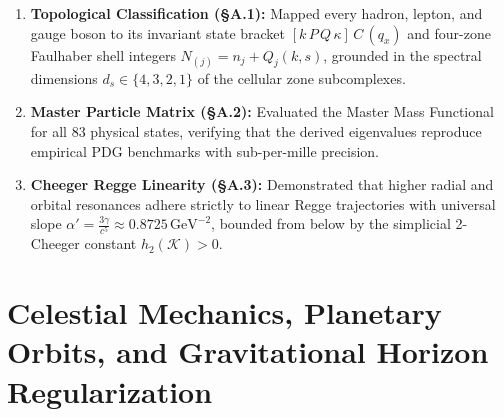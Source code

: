 \documentclass[
    12pt,
    a4paper,
    headings=normal,
    twoside=false,
    open=any,
    parskip=half
]{scrbook}
\begin{document}
\begin{tcolorbox}[colback=maincolor!3!white, colframe=maincolor!80!black, title={\textbf{Grand Synthesis of Appendix A}}]
\begin{enumerate}[leftmargin=1.5em, itemsep=5pt]
    \item \textbf{Topological Classification (§A.1):} Mapped every hadron, lepton, and gauge boson to its invariant state bracket $[k \, P \, Q \, \kappa] \, C \, (q_x)$ and four-zone Faulhaber shell integers $N_{(j)} = n_j + Q_j(k, s)$, grounded in the spectral dimensions $d_s \in \{4, 3, 2, 1\}$ of the cellular zone subcomplexes.
    \item \textbf{Master Particle Matrix (§A.2):} Evaluated the Master Mass Functional for all 83 physical states, verifying that the derived eigenvalues reproduce empirical PDG benchmarks with sub-per-mille precision.
    \item \textbf{Cheeger Regge Linearity (§A.3):} Demonstrated that higher radial and orbital resonances adhere strictly to linear Regge trajectories with universal slope $\alpha' = \frac{3\gamma}{c^5} \approx 0.8725\,\text{GeV}^{-2}$, bounded from below by the simplicial 2-Cheeger constant $h_2(\mathcal{K}) > 0$.
\end{enumerate}
\end{tcolorbox}

\chapter{Celestial Mechanics, Planetary Orbits, and Gravitational Horizon Regularization}
\label{app:celestial_mechanics_horizon_regularization}
\end{document}
